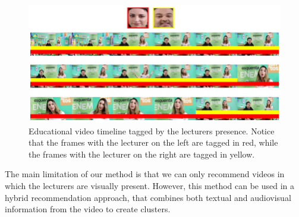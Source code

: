 \begin{figure}[!ht]
  \centering
  \includegraphics[width=0.8\linewidth]{img/face_clustering/example_localization.png}
  \caption{Educational video timeline tagged by the lecturers presence. Notice that the frames with the lecturer on the left are tagged in red, while the frames with the lecturer on the right are tagged in yellow.}
  \label{fig:video_timeline}
\end{figure}

The main limitation of our method is that we can only recommend videos in which the lecturers are visually present. However, this method can be used in a hybrid recommendation approach, that combines both textual and audiovisual information from the video to create clusters. 